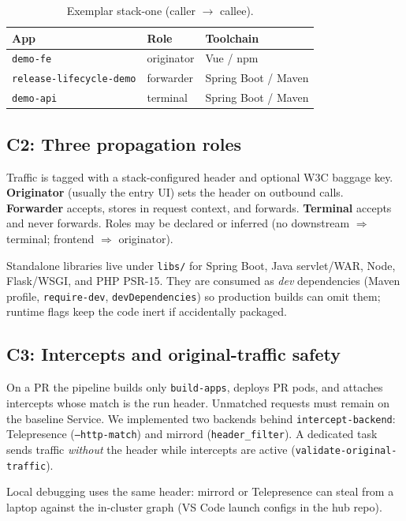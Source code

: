 \documentclass[10pt,conference]{IEEEtran}
\begin{document}
\begin{table}[!t]
\centering
\caption{Exemplar stack-one (caller $\rightarrow$ callee).}
\label{tab:stackone}
\begin{tabular}{@{}lll@{}}
\toprule
App & Role & Toolchain \\
\midrule
\texttt{demo-fe} & originator & Vue / npm \\
\texttt{release-lifecycle-demo} & forwarder & Spring Boot / Maven \\
\texttt{demo-api} & terminal & Spring Boot / Maven \\
\bottomrule
\end{tabular}
\end{table}

\subsection{C2: Three propagation roles}
\label{sec:c2}
Traffic is tagged with a stack-configured header and optional W3C baggage key. \textbf{Originator} (usually the entry UI) sets the header on outbound calls. \textbf{Forwarder} accepts, stores in request context, and forwards. \textbf{Terminal} accepts and never forwards. Roles may be declared or inferred (no downstream $\Rightarrow$ terminal; frontend $\Rightarrow$ originator).

Standalone libraries live under \texttt{libs/} for Spring Boot, Java servlet/WAR, Node, Flask/WSGI, and PHP PSR-15. They are consumed as \emph{dev} dependencies (Maven profile, \texttt{require-dev}, \texttt{devDependencies}) so production builds can omit them; runtime flags keep the code inert if accidentally packaged.

\subsection{C3: Intercepts and original-traffic safety}
\label{sec:c3}
On a PR the pipeline builds only \texttt{build-apps}, deploys PR pods, and attaches intercepts whose match is the run header. Unmatched requests must remain on the baseline Service. We implemented two backends behind \texttt{intercept-backend}: Telepresence (\texttt{--http-match}) and mirrord (\texttt{header\_filter}). A dedicated task sends traffic \emph{without} the header while intercepts are active (\texttt{validate-original-traffic}).

Local debugging uses the same header: mirrord or Telepresence can steal from a laptop against the in-cluster graph (VS Code launch configs in the hub repo).
\end{document}
